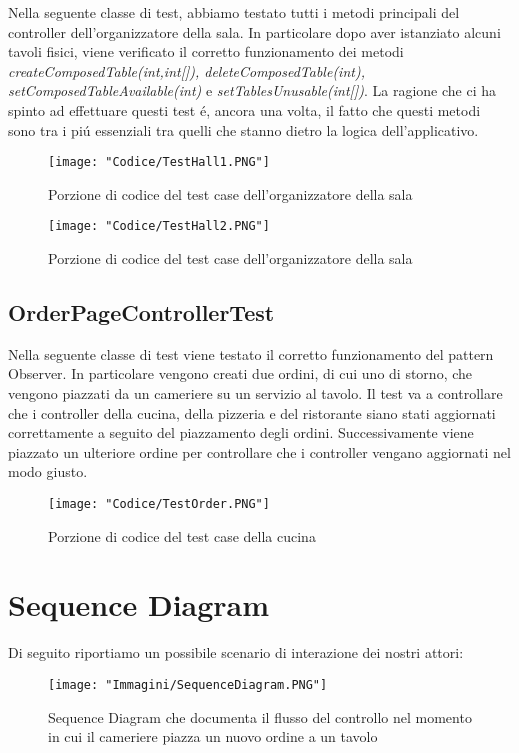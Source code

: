\documentclass{article}
\begin{document}
Nella seguente classe di test, abbiamo testato tutti i metodi principali del controller dell’organizzatore della sala. In particolare dopo aver istanziato alcuni tavoli fisici, viene verificato il corretto funzionamento dei metodi \textit{createComposedTable(int,int[]), deleteComposedTable(int), setComposedTableAvailable(int)} e \textit{setTablesUnusable(int[])}. La ragione che ci ha spinto ad effettuare questi test \'e, ancora una volta, il fatto che questi metodi sono tra i pi\'u essenziali tra quelli che stanno dietro la logica dell’applicativo.

\begin{figure}[!h]
\centering
\texttt{[image: "Codice/TestHall1.PNG"]}
\caption{Porzione di codice del test case dell'organizzatore della sala}
\end{figure}

\begin{figure}[!h]
\centering
\texttt{[image: "Codice/TestHall2.PNG"]}
\caption{Porzione di codice del test case dell'organizzatore della sala}
\end{figure}

\subsection{OrderPageControllerTest}

Nella seguente classe di test viene testato il corretto funzionamento del pattern Observer. In particolare vengono creati due ordini, di cui uno di storno, che vengono piazzati da un cameriere su un servizio al tavolo. Il test va a controllare che i controller della cucina, della pizzeria e del ristorante siano stati aggiornati correttamente a seguito del piazzamento degli ordini. Successivamente viene piazzato un ulteriore ordine per controllare che i controller vengano aggiornati nel modo giusto.

\begin{figure}[!h]
\centering
\texttt{[image: "Codice/TestOrder.PNG"]}
\caption{Porzione di codice del test case della cucina}
\end{figure}

\newpage

\section{Sequence Diagram}
Di seguito riportiamo un possibile scenario di interazione dei nostri attori:

\begin{figure}[!h]
\centering
\texttt{[image: "Immagini/SequenceDiagram.PNG"]}
\caption{Sequence Diagram che documenta il flusso del controllo nel momento in cui il cameriere piazza un nuovo ordine a un tavolo}
\label{SequenceDiagram}
\end{figure}
\end{document}
